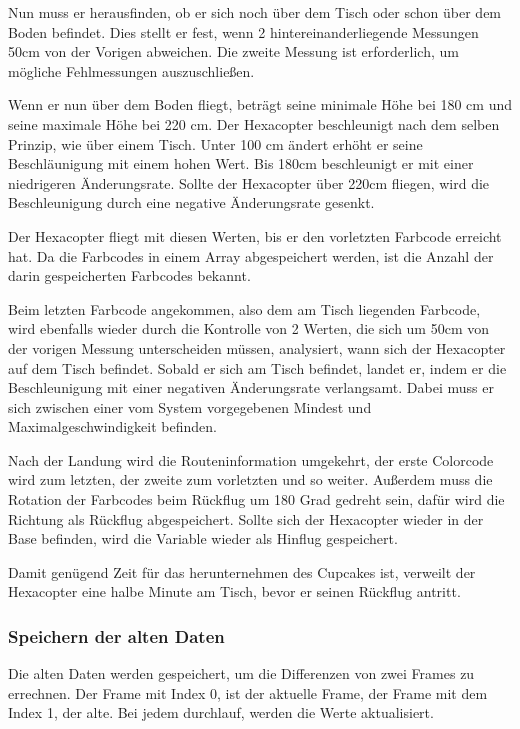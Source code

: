    Nun muss er herausfinden, ob er sich noch über dem Tisch oder schon über dem Boden befindet. Dies stellt er fest, wenn 2 hintereinanderliegende Messungen 50cm von der Vorigen abweichen. Die zweite Messung ist erforderlich, um mögliche Fehlmessungen auszuschließen.

    Wenn er nun über dem Boden fliegt, beträgt seine minimale Höhe bei 180 cm und seine maximale Höhe bei 220 cm.
    Der Hexacopter beschleunigt nach dem selben Prinzip, wie über einem Tisch. Unter 100 cm ändert erhöht er seine Beschläunigung mit einem hohen Wert. Bis 180cm beschleunigt er mit einer niedrigeren Änderungsrate. Sollte der Hexacopter über 220cm fliegen, wird die Beschleunigung durch eine negative Änderungsrate gesenkt.

    Der Hexacopter fliegt mit diesen Werten, bis er den vorletzten Farbcode erreicht hat. Da die Farbcodes in einem Array abgespeichert werden, ist die Anzahl der darin gespeicherten Farbcodes bekannt.

    Beim letzten Farbcode angekommen, also dem am Tisch liegenden Farbcode, wird ebenfalls wieder durch die Kontrolle von 2 Werten, die sich um 50cm von der vorigen Messung unterscheiden müssen, analysiert, wann sich der Hexacopter auf dem Tisch befindet. Sobald er sich am Tisch befindet, landet er, indem er die Beschleunigung mit einer negativen Änderungsrate verlangsamt. Dabei muss er sich zwischen einer vom System vorgegebenen Mindest und Maximalgeschwindigkeit befinden.

    Nach der Landung wird die Routeninformation umgekehrt, der erste Colorcode wird zum letzten, der zweite zum vorletzten und so weiter. Außerdem muss die Rotation der Farbcodes beim Rückflug um 180 Grad gedreht sein, dafür wird die Richtung als Rückflug abgespeichert. Sollte sich der Hexacopter wieder in der Base befinden, wird die Variable wieder als Hinflug gespeichert.

    Damit genügend Zeit für das herunternehmen des Cupcakes ist, verweilt der Hexacopter eine halbe Minute am Tisch, bevor er seinen Rückflug antritt.

    \subsubsection{Speichern der alten Daten}
    Die alten Daten werden gespeichert, um die Differenzen von zwei Frames zu errechnen. Der Frame mit Index 0, ist der aktuelle Frame, der Frame mit dem Index 1, der alte. Bei jedem durchlauf, werden die Werte aktualisiert.

